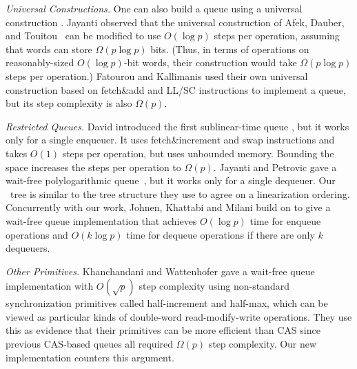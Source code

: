 
\emph{Universal Constructions.}
One can also build a queue using a universal construction \cite{10.1145/114005.102808}.
Jayanti \cite{DBLP:conf/podc/Jayanti98a} observed that
the universal construction of Afek, Dauber, and
Touitou~\cite{DBLP:conf/stoc/AfekDT95} can be modified to use $O(\log p)$ steps per operation, 
assuming that words can store $\Omega(p \log p)$ bits. 
(Thus, in terms of operations on reasonably-sized $O(\log p)$-bit words, their construction would take $\Omega(p\log p)$ steps per operation.)
Fatourou and Kallimanis \cite{FK14} used their own universal construction based on fetch\&add and LL/SC instructions
to implement a queue, but its step complexity is also $\Omega(p)$.

\emph{Restricted Queues.}
David introduced the first sublinear-time queue
\cite{DBLP:conf/wdag/David04}, but it works only for a single enqueuer.
It uses fetch\&increment and swap  instructions and takes $O(1)$ steps per operation, but
uses unbounded memory.  Bounding the space increases the steps per operation to $\Omega(p)$.
Jayanti and Petrovic gave a wait-free polylogarithmic
queue~\cite{DBLP:conf/fsttcs/JayantiP05}, but it works only for a single dequeuer. 
Our \ordering\ tree is similar to the tree structure they use to agree on a linearization ordering.
Concurrently with our work, Johnen, Khattabi and Milani \cite{JKM23} build on \cite{DBLP:conf/fsttcs/JayantiP05} to give a wait-free queue implementation 
that achieves $O(\log p)$ time for enqueue operations and $O(k \log p)$ time for dequeue operations if there are only $k$ dequeuers.


\emph{Other Primitives.}
Khanchandani and Wattenhofer \cite{KW18} gave a wait-free queue implementation
with $O(\sqrt{p})$ step complexity using non-standard synchronization primitives
called half-increment and half-max, which can be viewed as particular kinds of
double-word read-modify-write operations.
They use this as evidence that their primitives can be more efficient than CAS
since previous CAS-based queues all required $\Omega(p)$ step complexity.
Our new implementation counters this argument.

